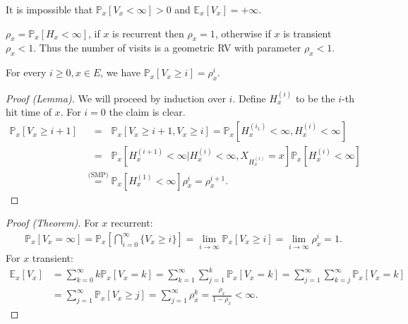 \begin{rmk}[]
It is impossible that $\mathbb{P}_{x} \left[ V_x<\infty \right] >0 $ and $\mathbb{E}_{x} \left[ V_x \right] =+\infty$.
\end{rmk}


\begin{defn}
	$\rho_x = \mathbb{P}_{x} \left[ H_x<\infty \right]$, if $x$ is recurrent then $\rho_x=1$, otherwise if $x$ is transient $\rho_x<1$. Thus the number of visits is a geometric RV with parameter $\rho_x<1$.
\end{defn}

\begin{lemma}[]
	For every $i\geq 0, x \in E$, we have $\mathbb{P}_{x} \left[ V_x \geq i \right] = \rho_x^{i}$.
\end{lemma}

\begin{proof}[Proof (Lemma)]
	We will proceed by induction over $i$. Define $H_x^{(i)}$ to be the $i$-th hit time of $x$. For $i=0$ the claim is clear.
	\begin{align}
		\mathbb{P}_{x} \left[ V_x \geq i+1 \right] &\stackrel{\phantom{\text{(SMP)}}}{=} \mathbb{P}_{x} \left[ V_x \geq i+1, V_x \geq i \right] = \mathbb{P}_{x} \left[ H_x^{(i_1)} < \infty, H_x^{(i)} < \infty \right] \\
		&\stackrel{\phantom{\text{(SMP)}}}{=} \mathbb{P}_{x} \left[ H_x^{(i+1)} < \infty | H_x^{(i)} < \infty, X_{H_x^{(i)}}=x \right] \mathbb{P}_{x} \left[ H_x^{(i)} < \infty \right] \\
		&\stackrel{\text{(SMP)}}{=} \mathbb{P}_{x} \left[ H_x^{(1)} < \infty \right] \rho_x^i = \rho_x^{i+1}   
	.\end{align}
\end{proof}

\begin{proof}[Proof (Theorem)]
	For $x$ recurrent: 
	\begin{align}
		\mathbb{P}_{x} \left[ V_x = \infty \right] = \mathbb{P}_{x} \left[ \bigcap_{i=0}^{\infty} \{V_x \geq i\} \right] = \lim_{i\to \infty} \mathbb{P}_{x} \left[ V_x \geq i \right] = \lim_{i \to \infty} \rho_x^{i} = 1 
	.\end{align}
	For $x$ transient:
	\begin{align}
		\mathbb{E}_{x} \left[ V_x \right] &= \sum_{k=0}^{\infty} k \mathbb{P}_{x} \left[ V_x = k \right] = \sum_{k=1}^{\infty} \sum_{j=1}^{k} \mathbb{P}_{x} \left[ V_x=k \right] = \sum_{j=1}^{\infty} \sum_{k=j}^{\infty} \mathbb{P}_{x} \left[ V_x=k \right] \\
	&= \sum_{j=1}^{\infty} \mathbb{P}_{x} \left[ V_x \geq j \right] = \sum_{j=1}^{\infty} \rho_x^k = \frac{\rho_x}{1-\rho_x} < \infty
	.\end{align}
\end{proof}

